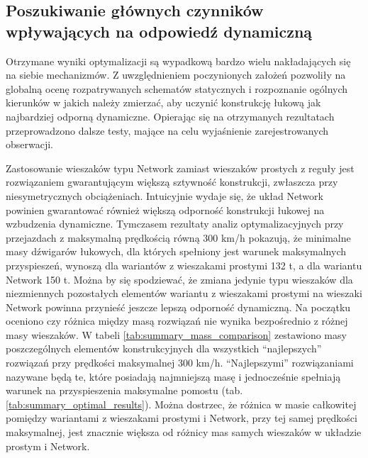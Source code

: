 \subsection{Poszukiwanie głównych czynników wpływających na odpowiedź dynamiczną}
Otrzymane wyniki optymalizacji są wypadkową bardzo wielu nakładających się na siebie mechanizmów. Z uwzględnieniem poczynionych założeń pozwoliły na globalną ocenę rozpatrywanych schematów statycznych i rozpoznanie ogólnych kierunków w jakich należy zmierzać, aby uczynić konstrukcję łukową jak najbardziej odporną dynamiczne. Opierając się na otrzymanych rezultatach przeprowadzono dalsze testy, mające na celu wyjaśnienie zarejestrowanych obserwacji.

Zastosowanie wieszaków typu Network zamiast wieszaków prostych z reguły jest rozwiązaniem gwarantującym większą sztywność konstrukcji, zwłaszcza przy niesymetrycznych obciążeniach. Intuicyjnie wydaje się, że układ Network powinien gwarantować również większą odporność konstrukcji łukowej na wzbudzenia dynamiczne. Tymczasem rezultaty analiz optymalizacyjnych przy przejazdach z maksymalną prędkością równą 300 km/h pokazują, że minimalne masy dźwigarów łukowych, dla których spełniony jest warunek maksymalnych przyspieszeń, wynoszą dla wariantów z wieszakami prostymi 132 t, a dla wariantu Network 150 t. Można by się spodziewać, że zmiana jedynie typu wieszaków dla niezmiennych pozostałych elementów wariantu z wieszakami prostymi na wieszaki Network powinna przynieść jeszcze lepszą odporność dynamiczną. Na początku oceniono czy różnica między masą rozwiązań nie wynika bezpośrednio z różnej masy wieszaków.  W tabeli \ref{tab:summary_mass_comparison} zestawiono masy poszczególnych elementów konstrukcyjnych dla wszystkich \enquote{najlepszych} rozwiązań przy prędkości maksymalnej 300 km/h. \enquote{Najlepszymi} rozwiązaniami nazywane będą te, które posiadają najmniejszą masę i jednocześnie spełniają warunek na przyspieszenia maksymalne pomostu (tab. \ref{tab:summary_optimal_results}). Można dostrzec, że różnica w masie całkowitej pomiędzy wariantami z wieszakami prostymi i Network, przy tej samej prędkości maksymalnej, jest znacznie większa od różnicy mas samych wieszaków w układzie prostym i Network. 

